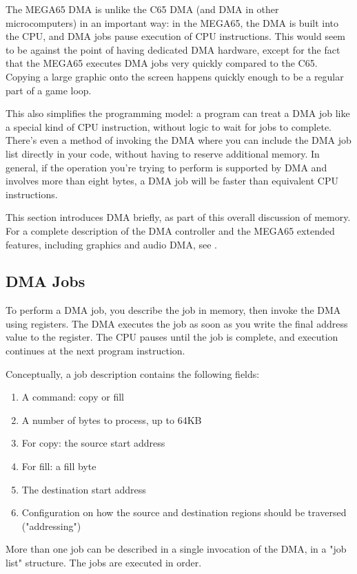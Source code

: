 The MEGA65 DMA is unlike the C65 DMA (and DMA in other microcomputers) in an
important way: in the MEGA65, the DMA is built into the CPU, and DMA jobs pause
execution of CPU instructions. This would seem to be against the point of
having dedicated DMA hardware, except for the fact that the MEGA65 executes DMA
jobs very quickly compared to the C65. Copying a large graphic onto the screen
happens quickly enough to be a regular part of a game loop.

This also simplifies the programming model: a program can treat a DMA job like
a special kind of CPU instruction, without logic to wait for jobs to complete.
There's even a method of invoking the DMA where you can include the DMA job
list directly in your code, without having to reserve additional memory. In
general, if the operation you're trying to perform is supported by DMA and
involves more than eight bytes, a DMA job will be faster than equivalent CPU
instructions.

This section introduces DMA briefly, as part of this overall discussion of
memory. For a complete description of the DMA controller and the MEGA65
extended features, including graphics and audio DMA, see .

\subsection{DMA Jobs}

To perform a DMA job, you describe the job in memory, then invoke the DMA using
registers. The DMA executes the job as soon as you write the final address
value to the register. The CPU pauses until the job is complete, and execution
continues at the next program instruction.

Conceptually, a job description contains the following fields:

\begin{enumerate}
\item A command: copy or fill
\item A number of bytes to process, up to 64KB
\item For copy: the source start address
\item For fill: a fill byte
\item The destination start address
\item Configuration on how the source and destination regions should be
traversed ("addressing")
\end{enumerate}

More than one job can be described in a single invocation of the DMA, in a "job
list" structure. The jobs are executed in order.


